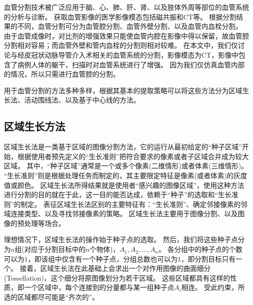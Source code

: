 血管分割技术被广泛应用于脑、心、肺、肝、肾、以及肢体外周等部位的血管系统的分析与诊断。
获取血管影像的医学影像模态包括磁共振和CT等。
根据分割结果的不同，血管分割可分为血管腔分割、血管外壁分割、以及血管内血栓分割\cite{Lesage2009Review}。
由于血管成像时，对比剂的增强效果只能使血管内腔在影像中得以保留，故血管腔分割相对容易；而血管外壁和管内血栓的分割则相对较难。
在本文中，我们仅讨论与经皮冠状动脉导管介入术相关的血管系统的分割，影像模态为CT，影像中包含了病例人体的躯干，扫描时对血管系统进行了增强。
因为我们仅仿真血管内部的情况，所以只需进行血管腔的分割。

用于血管分割的方法多种多样，根据其基本的提取策略可以将这些方法分为区域生长法、活动围线法、以及基于中心线的方法。

\subsection{区域生长方法}

区域生长法是一类基于区域的图像分割方法，它的运行从最初给定的“种子区域”开始，根据使用者预先定义的“生长准则”把符合要求的像素或者子区域合并成为较大区域。
其中，“种子区域”通常是一个或多个像素(二维情形)或者体素(三维情形)。
“生长准则”则是根据处理任务而制定的，其主要限定特征是像素(或者体素)的灰度值或颜色\cite{Gonzalez2004Matlab}。
区域生长法所得结果就是使用者“感兴趣的图像区域”，使用这种方法进行分割的目的就在于此，这一目的能否达成，依赖于“种子”的选取和“生长准则”的制定。
表征区域生长法区别的主要特征有：“生长准则”、确定邻接像素的邻域连接类型、以及寻找邻接像素的策略\cite{Ibanez2005ITKGuide}。
区域生长法主要用于图像分割、以及图像的预处理等场合。

理想情况下，区域生长法的操作始于种子点的选取。
然后，我们将这些种子点分为$n$组(对应于分割目标中的$n$个物体)，$A_1, A_2, \ldots, A_n$。
各分组中的种子点的个数可以为$1$，即该组中仅含有一个种子点，分组总数也可以为$1$，即分割目标只有一个。
接着，区域生长法在此基础上会求出一个对作用图像的曲面细分(Tessellation)，这个细分将原图像划分为若干区域。
这些区域都具有这样的性质，即一个区域中，每个连接到的分量都与某一组种子点$A_i$相连。
受此约束，所选的区域都尽可能是“齐次的”\cite{Adams1994SRG}。

